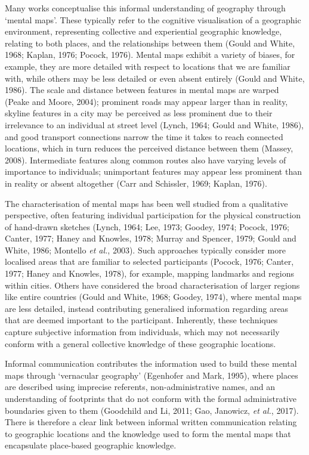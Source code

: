 \documentclass[
  letterpaper,
  11pt,
  english,
  onehalfspacing,
  headsepline]{MastersDoctoralThesis}
\begin{document}
Many works conceptualise this informal understanding of geography
through `mental maps'. These typically refer to the cognitive
visualisation of a geographic environment, representing collective and
experiential geographic knowledge, relating to both places, and the
relationships between them (Gould and White, 1968; Kaplan, 1976; Pocock,
1976). Mental maps exhibit a variety of biases, for example, they are
more detailed with respect to locations that we are familiar with, while
others may be less detailed or even absent entirely (Gould and White,
1986). The scale and distance between features in mental maps are warped
(Peake and Moore, 2004); prominent roads may appear larger than in
reality, skyline features in a city may be perceived as less prominent
due to their irrelevance to an individual at street level (Lynch, 1964;
Gould and White, 1986), and good transport connections narrow the time
it takes to reach connected locations, which in turn reduces the
perceived distance between them (Massey, 2008). Intermediate features
along common routes also have varying levels of importance to
individuals; unimportant features may appear less prominent than in
reality or absent altogether (Carr and Schissler, 1969; Kaplan, 1976).

The characterisation of mental maps has been well studied from a
qualitative perspective, often featuring individual participation for
the physical construction of hand-drawn sketches (Lynch, 1964; Lee,
1973; Goodey, 1974; Pocock, 1976; Canter, 1977; Haney and Knowles, 1978;
Murray and Spencer, 1979; Gould and White, 1986; Montello \emph{et al.},
2003). Such approaches typically consider more localised areas that are
familiar to selected participants (Pocock, 1976; Canter, 1977; Haney and
Knowles, 1978), for example, mapping landmarks and regions within
cities. Others have considered the broad characterisation of larger
regions like entire countries (Gould and White, 1968; Goodey, 1974),
where mental maps are less detailed, instead contributing generalised
information regarding areas that are deemed important to the
participant. Inherently, these techniques capture subjective information
from individuals, which may not necessarily conform with a general
collective knowledge of these geographic locations.

Informal communication contributes the information used to build these
mental maps through `vernacular geography' (Egenhofer and Mark, 1995),
where places are described using imprecise referents, non-administrative
names, and an understanding of footprints that do not conform with the
formal administrative boundaries given to them (Goodchild and Li, 2011;
Gao, Janowicz, \emph{et al.}, 2017). There is therefore a clear link
between informal written communication relating to geographic locations
and the knowledge used to form the mental maps that encapsulate
place-based geographic knowledge.
\end{document}
